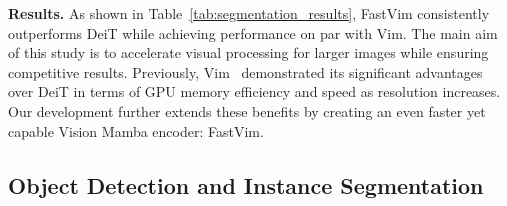 \begin{table}[ht]
    \caption{Semantic segmentation benchmarks on \textbf{ADE20K}~\cite{ade20k} dataset. UperNet~\cite{upernet} framework is used for all comparison backbones, with a crop size of 512 $\times$ 512.}
   \vspace{-12pt}
    \begin{center}
\end{center}
\vspace{-12pt}
    \label{tab:segmentation_results}
\end{table}


\noindent \textbf{Results.} As shown in Table~\ref{tab:segmentation_results}, FastVim consistently outperforms DeiT while achieving performance on par with Vim. The main aim of this study is to accelerate visual processing for larger images while ensuring competitive results. 
Previously, Vim~\cite{vim} demonstrated its significant advantages over DeiT in terms of GPU memory efficiency and speed as resolution increases. Our development further extends these benefits by creating an even faster yet capable Vision Mamba encoder: FastVim. 




\subsection{Object Detection and Instance Segmentation}
\label{subexp:detection}

